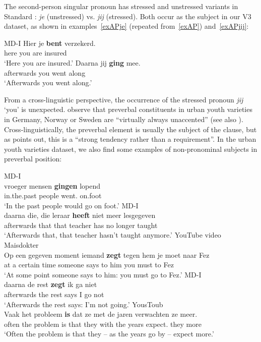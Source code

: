 \documentclass[output=paper]{langsci/langscibook}
\begin{document}
\noindent The second-person singular pronoun has stressed and unstressed
variants in Standard : \emph{je} (unstressed) vs. \emph{jij}
(stressed). Both occur as the subject in our V3 dataset, as shown in
examples~\eqref{exAPje} (repeated from~\eqref{exAP}) and~\eqref{exAPjij}:

\ea MD-I
    \ea
    \gll\label{exAPje}Hier je \textbf{bent} verzekerd.\\
    here you are insured\\
    \trans \enquote*{Here you are insured.}
    \ex
    \gll\label{exAPjij}Daarna jij \textbf{ging} mee.\\
    afterwards you went along\\
    \trans \enquote*{Afterwards you went along.}
    \z
\z

\noindent From a cross-linguistic perspective, the occurrence of the stressed
pronoun \emph{jij} `you' is unexpected. \citet[84]{Freywaldetal:2015} observe
that preverbal constituents in urban youth varieties in Germany, Norway or
Sweden are \enquote{virtually always unaccented} (see also
\citet{Walkden:2017}).  Cross-linguistically, the preverbal element is usually
the subject of the clause, but as \textcite{Walkden:2017} points out, this is a
\enquote{strong tendency rather than a requirement}. In the  urban
youth varieties dataset, we also find some examples of non-pronominal subjects
in preverbal position:

\ea
    \ea\label{exsbjnp} MD-I\\
    \gll\label{exsbjnpa}vroeger mensen \textbf{gingen} lopend\\
    in.the.past people went.\Pl{} on.foot\\
    \trans \enquote*{In the past people would go on foot.}
    \ex MD-I\\
    \gll\label{exsbjnpb}daarna die, die leraar \textbf{heeft} niet meer lesgegeven\\
    afterwards that that teacher has no longer taught\\
    \trans \enquote*{Afterwards that, that teacher hasn't taught anymore.}
    \ex YouTube video Maisdokter\\
    \gll\label{exsbjnpc}Op een gegeven moment iemand \textbf{zegt} tegen hem je moet naar Fez\\
    at a certain time someone says to him you must to Fez\\
    \trans \enquote*{At some point someone says to him: you must go to Fez.}
    \ex MD-I\\
    \gll\label{exsbjnpd}daarna de rest \textbf{zegt} ik ga niet\\
    afterwards the rest says I go not\\
    \trans \enquote*{Afterwards the rest says: I'm not going.}
    \ex YousToub\\
    \gll\label{exsbjnpe}Vaak het probleem \textbf{is} dat ze met de jaren verwachten ze meer.\\
    often the problem is that they with the years expect.\Pl{} they more\\
    \trans \enquote*{Often the problem is that they -- as the years go by -- expect more.}
    \z
\z
\end{document}
